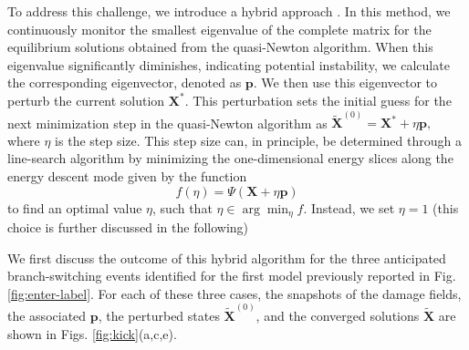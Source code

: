 To address this challenge, we introduce a hybrid approach . In this method, we continuously monitor the smallest eigenvalue of the complete  matrix for the equilibrium solutions obtained from the quasi-Newton algorithm.
When this eigenvalue significantly diminishes, indicating potential instability, we calculate the corresponding eigenvector, denoted as \(\mathbf{p}\). We then use this eigenvector to perturb the current solution $\mathbf{X^*}$. This perturbation sets the initial guess for the next minimization step in the quasi-Newton algorithm as $\mathbf{\tilde X}^{(0)} = \mathbf{X^*} + \eta \mathbf{p},
$ where \(\eta\) is the step size.
This step size can, in principle, be determined through a line-search algorithm by minimizing the one-dimensional energy slices along the energy descent mode given by the function 
$$f(\eta) = \Psi(\mathbf{X} + \eta \mathbf{p})
\label{eqn:energy-slice}$$
 to find an optimal value \(\eta\), such that $\eta \in \arg \min_{\eta} f$. Instead, we   set \(\eta = 1\)  (this choice is further discussed in the following) 

We first discuss the outcome of this hybrid algorithm for the three anticipated branch-switching events identified for the first model previously reported in Fig. \ref{fig:enter-label}. For each of these three cases, the snapshots of the damage fields, the associated  \(\mathbf{p}\),  the perturbed states \(\mathbf{\tilde X}^{(0)}\), and the converged solutions $\mathbf{\tilde X}$ are shown in Figs. \ref{fig:kick}(a,c,e).

